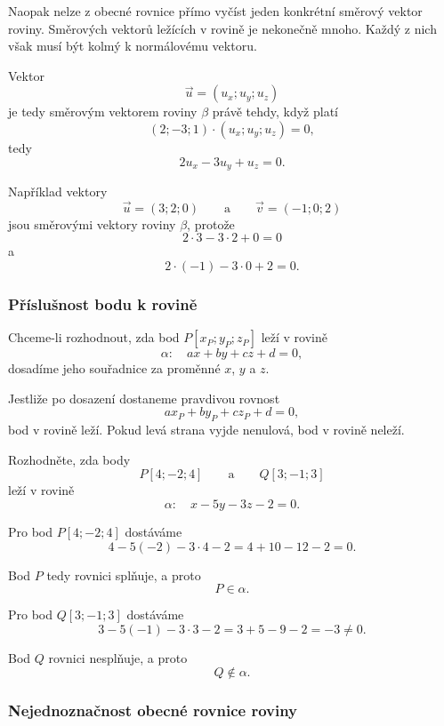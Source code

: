 Naopak nelze z obecné rovnice přímo vyčíst jeden konkrétní směrový
vektor roviny. Směrových vektorů ležících v rovině je nekonečně mnoho.
Každý z nich však musí být kolmý k normálovému vektoru.

Vektor
\[
    \vec{u}=(u_x;u_y;u_z)
\]
je tedy směrovým vektorem roviny $\beta$ právě tehdy, když platí
\[
    (2;-3;1)\cdot(u_x;u_y;u_z)=0,
\]
tedy
\[
    2u_x-3u_y+u_z=0.
\]

Například vektory
\[
    \vec{u}=(3;2;0)
    \qquad\text{a}\qquad
    \vec{v}=(-1;0;2)
\]
jsou směrovými vektory roviny $\beta$, protože
\[
    2\cdot3-3\cdot2+0=0
\]
a
\[
    2\cdot(-1)-3\cdot0+2=0.
\]


\subsubsection{Příslušnost bodu k rovině}
\label{subsubsec:Point_membership_general_plane}

Chceme-li rozhodnout, zda bod $P[x_P;y_P;z_P]$ leží v rovině
\[
    \alpha:\quad ax+by+cz+d=0,
\]
dosadíme jeho souřadnice za proměnné $x$, $y$ a $z$.

Jestliže po dosazení dostaneme pravdivou rovnost
\[
    ax_P+by_P+cz_P+d=0,
\]
bod v rovině leží. Pokud levá strana vyjde nenulová, bod v rovině
neleží.

\begin{example}
    \label{exa:Point_membership_general_plane}

    Rozhodněte, zda body
    \[
        P[4;-2;4]
        \qquad\text{a}\qquad
        Q[3;-1;3]
    \]
    leží v rovině
    \[
        \alpha:\quad x-5y-3z-2=0.
    \]

    Pro bod $P[4;-2;4]$ dostáváme
    \[
        4-5(-2)-3\cdot4-2
        =
        4+10-12-2
        =
        0.
    \]

    Bod $P$ tedy rovnici splňuje, a proto
    \[
        P\in\alpha.
    \]

    Pro bod $Q[3;-1;3]$ dostáváme
    \[
        3-5(-1)-3\cdot3-2
        =
        3+5-9-2
        =
        -3\neq0.
    \]

    Bod $Q$ rovnici nesplňuje, a proto
    \[
        Q\notin\alpha.
    \]
\end{example}


\subsubsection{Nejednoznačnost obecné rovnice roviny}
\label{subsubsec:Nonuniqueness_general_plane_equation}

